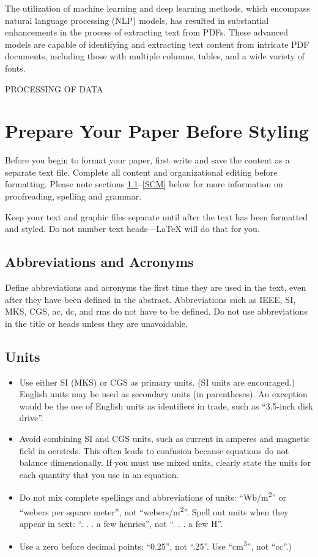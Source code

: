 \documentclass[conference]{IEEEtran}
\begin{document}
The utilization of machine learning and deep learning methods, which encompass natural language processing (NLP) models, has resulted in substantial enhancements in the process of extracting text from PDFs. These advanced models are capable of identifying and extracting text content from intricate PDF documents, including those with multiple columns, tables, and a wide variety of fonts.


PROCESSING OF DATA



\section{Prepare Your Paper Before Styling}
Before you begin to format your paper, first write and save the content as a 
separate text file. Complete all content and organizational editing before 
formatting. Please note sections \ref{AA}--\ref{SCM} below for more information on 
proofreading, spelling and grammar.

Keep your text and graphic files separate until after the text has been 
formatted and styled. Do not number text heads---{\LaTeX} will do that 
for you.

\subsection{Abbreviations and Acronyms}\label{AA}
Define abbreviations and acronyms the first time they are used in the text, 
even after they have been defined in the abstract. Abbreviations such as 
IEEE, SI, MKS, CGS, ac, dc, and rms do not have to be defined. Do not use 
abbreviations in the title or heads unless they are unavoidable.

\subsection{Units}
\begin{itemize}
\item Use either SI (MKS) or CGS as primary units. (SI units are encouraged.) English units may be used as secondary units (in parentheses). An exception would be the use of English units as identifiers in trade, such as ``3.5-inch disk drive''.
\item Avoid combining SI and CGS units, such as current in amperes and magnetic field in oersteds. This often leads to confusion because equations do not balance dimensionally. If you must use mixed units, clearly state the units for each quantity that you use in an equation.
\item Do not mix complete spellings and abbreviations of units: ``Wb/m\textsuperscript{2}'' or ``webers per square meter'', not ``webers/m\textsuperscript{2}''. Spell out units when they appear in text: ``. . . a few henries'', not ``. . . a few H''.
\item Use a zero before decimal points: ``0.25'', not ``.25''. Use ``cm\textsuperscript{3}'', not ``cc''.)
\end{itemize}
\end{document}
